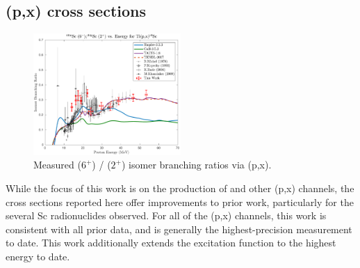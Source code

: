 


\subsection{(p,x) cross sections} 


\begin{figure}[h]
 \centering
 \includegraphics[width=0.5\textwidth]{./figures/44Sc_IBR.pdf}
 \caption{Measured  ($6^+$) /   ($2^+$)  isomer branching ratios via (p,x).}
 \label{fig:44Sc_IBR}
\end{figure}



While the focus of this work is on the production of   and other (p,x) channels, the cross sections reported here offer improvements to prior work, particularly for the several Sc radionuclides observed. 
For all of the (p,x) channels, this work is consistent with all prior data, and is generally the highest-precision measurement to date.
This work additionally  extends the  excitation function to the highest energy to date. 



